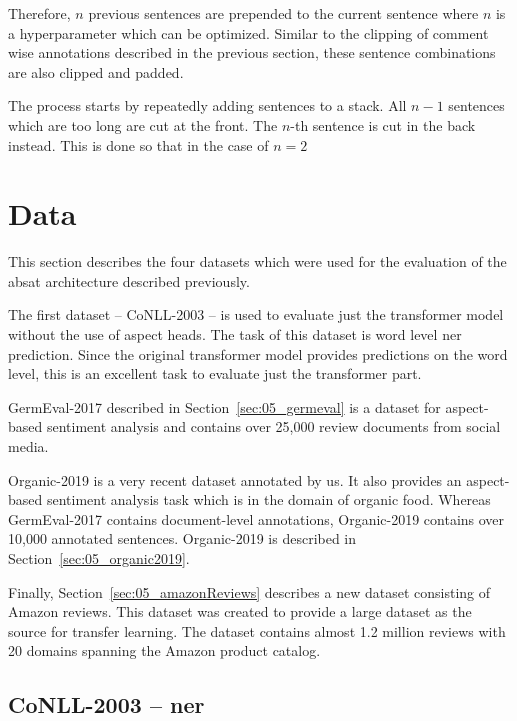 Therefore, $n$ previous sentences are prepended to the current sentence where $n$ is a hyperparameter which can be optimized. Similar to the clipping of comment wise annotations described in the previous section, these sentence combinations are also clipped and padded. 
\medskip

The process starts by repeatedly adding sentences to a stack. All $n-1$ sentences which are too long are cut at the front. The $n$-th sentence is cut in the back instead. This is done so that in the case of $n=2$ 


\section{Data}
\label{sec:05_Data}

This section describes the four datasets which were used for the evaluation of the \acrfull{absat} architecture described previously.

The first dataset -- CoNLL-2003 -- is used to evaluate just the transformer model without the use of aspect heads. The task of this dataset is word level \gls{ner} prediction. Since the original transformer model provides predictions on the word level, this is an excellent task to evaluate just the transformer part.
\medskip

GermEval-2017 described in Section~\ref{sec:05_germeval} is a dataset for aspect-based sentiment analysis and contains over 25,000 review documents from social media.
\medskip

Organic-2019 is a very recent dataset annotated by us. It also provides an aspect-based sentiment analysis task which is in the domain of organic food. Whereas GermEval-2017 contains document-level annotations, Organic-2019 contains over 10,000 annotated sentences. Organic-2019 is described in Section~\ref{sec:05_organic2019}.
\medskip

Finally, Section~\ref{sec:05_amazonReviews} describes a new dataset consisting of Amazon reviews. This dataset was created to provide a large dataset as the source for transfer learning. The dataset contains almost 1.2 million reviews with 20 domains spanning the Amazon product catalog.

\subsection{CoNLL-2003 -- \acrfull{ner}}

